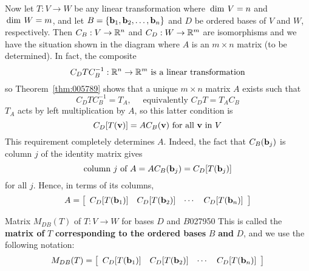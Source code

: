 \begin{wrapfigure}[7]{l}{5cm}
        \vspace*{-1em}
	\centering
	
\end{wrapfigure}

Now let $T : V \to W$ be any linear transformation where $\thinspace\operatorname{dim \medspace}V = n$ and $\thinspace\operatorname{dim \medspace}W = m$, and let $B = \{\textbf{b}_{1}, \textbf{b}_{2}, \dots, \textbf{b}_{n}\}$ and $D$ be ordered bases of $V$ and $W$, respectively. Then $C_{B} : V \to \mathbb{R}^n$ and $C_{D} : W \to \mathbb{R}^m$ are isomorphisms and we have the situation shown in the diagram where $A$ is an $m \times n$ matrix (to be determined). In fact, the composite
\begin{equation*}
C_DTC_B^{-1} : \mathbb{R}^n \to \mathbb{R}^m \mbox{ is a linear transformation}
\end{equation*}
so Theorem~\ref{thm:005789} shows that a unique $m \times n$ matrix $A$ exists such that
\begin{equation*}
C_DTC_B^{-1} = T_A, \quad \mbox{ equivalently } C_DT = T_AC_B
\end{equation*}
$T_{A}$ acts by left multiplication by $A$, so this latter condition is
\begin{equation*}
C_D [T(\textbf{v})] = AC_B(\textbf{v}) \mbox{ for all } \textbf{v} \mbox{ in } V
\end{equation*}
This requirement completely determines $A$. Indeed, the fact that $C_{B}(\textbf{b}_{j})$ is column $j$ of the identity matrix gives
\begin{equation*}
\mbox{column } j \mbox{ of } A = AC_B(\textbf{b}_j) = C_D[T(\textbf{b}_j)]
\end{equation*}
for all $j$. Hence, in terms of its columns,
\begin{equation*}
A = \left[
\begin{array}{cccc}
 C_D[T(\textbf{b}_1)] & C_D[T(\textbf{b}_2)] & \cdots & C_D[T(\textbf{b}_n)]
\end{array} \right]
\end{equation*}

\begin{definition}{Matrix $M_{DB}(T)$ of $T : V \to W$ for bases $D$ and $B$}{027950}
This is called the \textbf{matrix of} $T$ \textbf{corresponding to the ordered bases} $B$ \textbf{and} $D$, and we use the following notation:
\begin{equation*}
  M_{DB}(T) = \left[
\begin{array}{cccc}
 C_D[T(\textbf{b}_1)] & C_D[T(\textbf{b}_2)] & \cdots & C_D[T(\textbf{b}_n)] 
\end{array}\right]
\end{equation*}
\end{definition}

